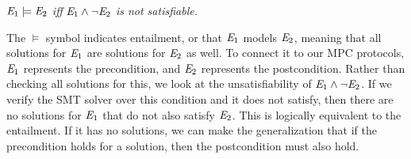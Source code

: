 \documentclass{article}
\begin{document}
\begin{center}
$\mathit{E}_1 \models \mathit{E}_2$ \textit{iff} $\mathit{E}_1 \wedge \neg\mathit{E}_2$ \textit{is not satisfiable.}
\end{center}

The $\models$ symbol indicates entailment, or that $\mathit{E}_1$ models $\mathit{E}_2$, meaning that all solutions for $\mathit{E}_1$ are solutions for $\mathit{E}_2$ as well. To connect it to our MPC protocols, $\mathit{E}_1$ represents the precondition, and $\mathit{E}_2$ represents the postcondition. Rather than checking all solutions for this, we look at the unsatisfiability of $\mathit{E}_1 \wedge \neg\mathit{E}_2$. If we verify the SMT solver over this condition and it does not satisfy, then there are no solutions for $\mathit{E}_1$ that do not also satisfy $\mathit{E}_2$. This is logically equivalent to the entailment. If it has no solutions, we can make the generalization that if the precondition holds for a solution, then the postcondition must also hold. 
\end{document}
